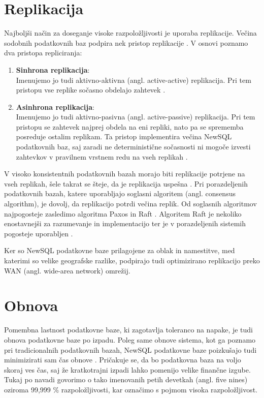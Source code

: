 \documentclass[a4paper, 12pt]{book}
\begin{document}
\section{Replikacija}

Najboljši način za doseganje visoke razpoložljivosti je uporaba replikacije. Večina sodobnih podatkovnih baz podpira nek pristop replikacije \cite{Pavlo2016Sep}. V osnovi poznamo dva pristopa repliciranja:
\begin{enumerate}
    \item \textbf{Sinhrona replikacija}:\\Imenujemo jo tudi aktivno-aktivna (angl. active-active) replikacija. Pri tem pristopu vse replike sočasno obdelajo zahtevek \cite{Pavlo2016Sep}.

    \item \textbf{Asinhrona replikacija}:\\Imenujemo jo tudi aktivno-pasivna (angl. active-passive) replikacija. Pri tem pristopu se zahtevek najprej obdela na eni repliki, nato pa se sprememba posreduje ostalim replikam. Ta pristop implementira večina NewSQL podatkovnih baz, saj zaradi ne deterministične sočas\-nosti ni mogoče izvesti zahtevkov v pravilnem vrstnem redu na vseh replikah \cite{Pavlo2016Sep, harding2017evaluation}.
\end{enumerate}

V visoko konsistentnih podatkovnih bazah morajo biti replikacije potrjene na vseh replikah, šele takrat se šteje, da je replikacija uspešna \cite{NewSqlInMemoryAnalytics}. Pri porazdeljenih podatkovnih bazah, katere uporabljajo soglasni algoritem (angl. consensus algorithm), je dovolj, da replikacijo potrdi večina replik. Od soglasnih algoritmov najpogosteje zasledimo algoritma Paxos in Raft \cite{raft-vs-paxos}. Algoritem Raft je nekoliko enostavnejši za razumevanje in implementacijo ter je v porazdeljenih sistemih pogosteje uporabljen \cite{raft-vs-paxos}. 

Ker so NewSQL podatkovne baze prilagojene za oblak in namestitve, med katerimi so velike geografske razlike, podpirajo tudi optimizirano replikacijo preko WAN (angl. wide-area network) omrežij.

\section{Obnova}
Pomembna lastnost podatkovne baze, ki zagotavlja toleranco na napake, je tudi obnova podatkovne baze po izpadu. Poleg same obnove sistema, kot ga poznamo pri tradicionalnih podatkovnih bazah, NewSQL podatkovne baze  poizkušajo tudi minimizirati sam čas obnove \cite{Pavlo2016Sep}. Pričakuje se, da bo podatkovna baza na voljo skoraj ves čas, saj že kratkotrajni izpadi lahko pomenijo velike finančne izgube. Tukaj po navadi govorimo o tako imenovanih petih devetkah (angl. five nines) oziroma 99,999 \% razpoložljivosti, kar označimo s pojmom visoka razpoložljivost.
\end{document}
